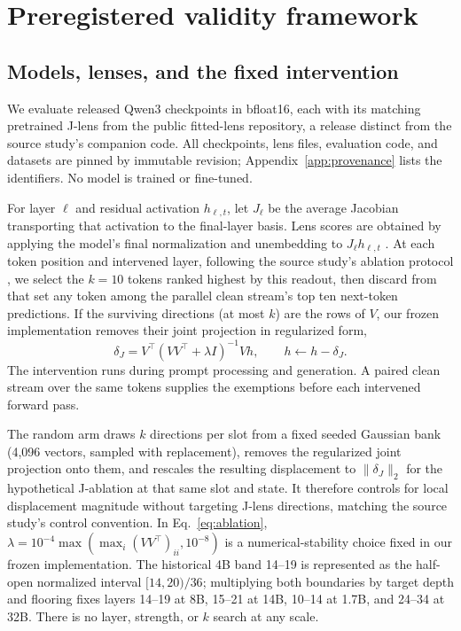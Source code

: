 \documentclass{article}
\newcommand{\jlens}{J-lens}
\begin{document}
\section{Preregistered validity framework}

\subsection{Models, lenses, and the fixed intervention}

We evaluate released Qwen3 checkpoints \citep{qwen3technicalreport} in bfloat16, each
with its matching pretrained \jlens{} from the public fitted-lens repository, a release
distinct from the source study's companion code. All checkpoints, lens files, evaluation code, and datasets are pinned by
immutable revision; Appendix~\ref{app:provenance} lists the identifiers. No model is
trained or fine-tuned.

For layer $\ell$ and residual activation $h_{\ell,t}$, let $J_\ell$ be the average
Jacobian transporting that activation to the final-layer basis. Lens scores are obtained
by applying the model's final normalization and unembedding to $J_\ell h_{\ell,t}$
\citep{gurnee2026verbalizable}. At each token position and intervened layer, following
the source study's ablation protocol \citep{gurnee2026verbalizable}, we select the
$k=10$ tokens ranked highest by this readout, then discard from that set any token among
the parallel clean stream's top ten next-token predictions. If the surviving directions
(at most $k$) are the rows of $V$, our frozen implementation removes their joint
projection in regularized form,
\begin{equation}
  \delta_J = V^\top (VV^\top + \lambda I)^{-1} Vh,
  \qquad h \leftarrow h-\delta_J .
  \label{eq:ablation}
\end{equation}
The intervention runs during prompt processing and generation. A paired clean stream over
the same tokens supplies the exemptions before each intervened forward pass.

The random arm draws $k$ directions per slot from a fixed seeded Gaussian bank
(4{,}096 vectors, sampled with replacement), removes the regularized joint projection
onto them, and rescales the resulting displacement to $\lVert\delta_J\rVert_2$ for the
hypothetical J-ablation at that same slot and state. It therefore controls for local
displacement magnitude without targeting \jlens{} directions, matching the source study's
control convention. In Eq.~\ref{eq:ablation},
$\lambda=10^{-4}\max(\max_i(VV^\top)_{ii},10^{-8})$ is a numerical-stability choice
fixed in our frozen implementation.
The historical 4B band 14--19 is represented as the half-open normalized interval
$[14,20)/36$; multiplying both boundaries by target depth and flooring fixes layers 14--19
at 8B, 15--21 at 14B, 10--14 at 1.7B, and 24--34 at 32B. There is no layer, strength, or
$k$ search at any scale.
\end{document}
